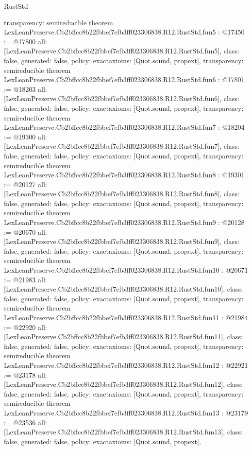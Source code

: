 \begin{lexlean}{RustStd}
\begin{coremodule}
{  transparency: semireducible
}
theorem LexLeanPreserve.Cb2bffcc8b22fbbef7efb3ff023306838.R12.RustStd.fun5 : @17450 := @17800 {
  all: [LexLeanPreserve.Cb2bffcc8b22fbbef7efb3ff023306838.R12.RustStd.fun5],
  class: false,
  generated: false,
  policy: exact{axioms: [Quot.sound, propext]},
  transparency: semireducible
}
theorem LexLeanPreserve.Cb2bffcc8b22fbbef7efb3ff023306838.R12.RustStd.fun6 : @17801 := @18203 {
  all: [LexLeanPreserve.Cb2bffcc8b22fbbef7efb3ff023306838.R12.RustStd.fun6],
  class: false,
  generated: false,
  policy: exact{axioms: [Quot.sound, propext]},
  transparency: semireducible
}
theorem LexLeanPreserve.Cb2bffcc8b22fbbef7efb3ff023306838.R12.RustStd.fun7 : @18204 := @19300 {
  all: [LexLeanPreserve.Cb2bffcc8b22fbbef7efb3ff023306838.R12.RustStd.fun7],
  class: false,
  generated: false,
  policy: exact{axioms: [Quot.sound, propext]},
  transparency: semireducible
}
theorem LexLeanPreserve.Cb2bffcc8b22fbbef7efb3ff023306838.R12.RustStd.fun8 : @19301 := @20127 {
  all: [LexLeanPreserve.Cb2bffcc8b22fbbef7efb3ff023306838.R12.RustStd.fun8],
  class: false,
  generated: false,
  policy: exact{axioms: [Quot.sound, propext]},
  transparency: semireducible
}
theorem LexLeanPreserve.Cb2bffcc8b22fbbef7efb3ff023306838.R12.RustStd.fun9 : @20128 := @20670 {
  all: [LexLeanPreserve.Cb2bffcc8b22fbbef7efb3ff023306838.R12.RustStd.fun9],
  class: false,
  generated: false,
  policy: exact{axioms: [Quot.sound, propext]},
  transparency: semireducible
}
theorem LexLeanPreserve.Cb2bffcc8b22fbbef7efb3ff023306838.R12.RustStd.fun10 : @20671 := @21983 {
  all: [LexLeanPreserve.Cb2bffcc8b22fbbef7efb3ff023306838.R12.RustStd.fun10],
  class: false,
  generated: false,
  policy: exact{axioms: [Quot.sound, propext]},
  transparency: semireducible
}
theorem LexLeanPreserve.Cb2bffcc8b22fbbef7efb3ff023306838.R12.RustStd.fun11 : @21984 := @22920 {
  all: [LexLeanPreserve.Cb2bffcc8b22fbbef7efb3ff023306838.R12.RustStd.fun11],
  class: false,
  generated: false,
  policy: exact{axioms: [Quot.sound, propext]},
  transparency: semireducible
}
theorem LexLeanPreserve.Cb2bffcc8b22fbbef7efb3ff023306838.R12.RustStd.fun12 : @22921 := @23178 {
  all: [LexLeanPreserve.Cb2bffcc8b22fbbef7efb3ff023306838.R12.RustStd.fun12],
  class: false,
  generated: false,
  policy: exact{axioms: [Quot.sound, propext]},
  transparency: semireducible
}
theorem LexLeanPreserve.Cb2bffcc8b22fbbef7efb3ff023306838.R12.RustStd.fun13 : @23179 := @23536 {
  all: [LexLeanPreserve.Cb2bffcc8b22fbbef7efb3ff023306838.R12.RustStd.fun13],
  class: false,
  generated: false,
  policy: exact{axioms: [Quot.sound, propext]},
}
\end{coremodule}
\end{lexlean}
